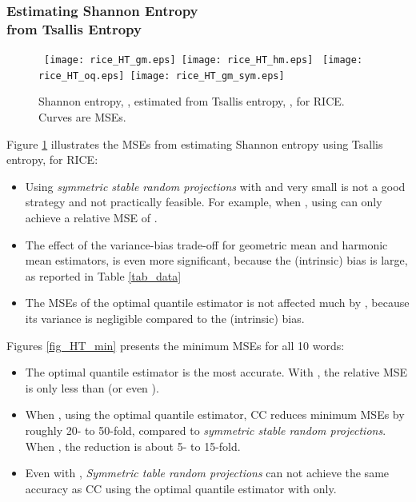 \documentclass{sig-alternate}
\begin{document}
\subsubsection{Estimating Shannon Entropy\\ from Tsallis Entropy}

\begin{figure}[h]
\begin{center}\mbox{
{\texttt{[image: rice\_HT\_gm.eps]}} \hspace{-0.1in}
{\texttt{[image: rice\_HT\_hm.eps]}}}
\mbox{
{\texttt{[image: rice\_HT\_oq.eps]}} \hspace{-0.1in}
{\texttt{[image: rice\_HT\_gm\_sym.eps]}}
}
\end{center}
\vspace{-0.15in}
\caption{ Shannon entropy, , estimated from Tsallis entropy, , for RICE. Curves are MSEs.}\label{fig_rice_HT}
\end{figure}


Figure \ref{fig_rice_HT} illustrates the MSEs from estimating Shannon entropy using Tsallis entropy, for RICE:
\begin{itemize}
\item Using {\em symmetric stable random projections} with  and very small  is not a good strategy and not practically feasible. For example, when , using  can only achieve a relative MSE of .
\item The effect of the variance-bias trade-off for geometric mean and harmonic mean estimators, is even more significant, because the (intrinsic) bias  is large, as reported in Table \ref{tab_data}
\item The MSEs of the optimal quantile estimator is not affected much by , because its variance is negligible compared to the (intrinsic) bias.
\end{itemize}


Figures \ref{fig_HT_min} presents the minimum MSEs for all 10 words:
\begin{itemize}
\item The optimal quantile estimator is the most accurate.  With , the relative MSE is only less than  (or even ).
\item When , using the optimal quantile estimator, CC reduces  minimum MSEs by roughly 20-  to 50-fold, compared to {\em symmetric stable random projections}. When , the reduction is about 5- to 15-fold.
\item Even with , {\em Symmetric table random projections} can not achieve the same accuracy as CC using the optimal quantile estimator with  only.
\end{itemize}
\end{document}
